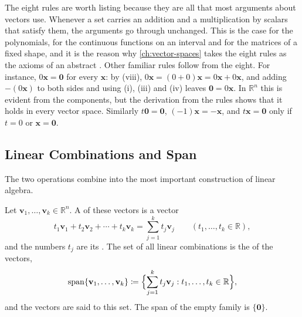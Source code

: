 The eight rules are worth listing because they are all that most arguments about vectors use. Whenever a set carries an addition and a multiplication by scalars that satisfy them, the arguments go through unchanged. This is the case for the polynomials, for the continuous functions on an interval and for the matrices of a fixed shape, and it is the reason why \cref{ch:vector-spaces} takes the eight rules as the axioms of an abstract . Other familiar rules follow from the eight. For instance, $0\mathbf x=\mathbf 0$ for every $\mathbf x$: by (viii), $0\mathbf x=(0+0)\mathbf x=0\mathbf x+0\mathbf x$, and adding $-(0\mathbf x)$ to both sides and using (i), (iii) and (iv) leaves $\mathbf 0=0\mathbf x$. In $\mathbb R^n$ this is evident from the components, but the derivation from the rules shows that it holds in every vector space. Similarly $t\mathbf 0=\mathbf 0$, $(-1)\mathbf x=-\mathbf x$, and $t\mathbf x=\mathbf 0$ only if $t=0$ or $\mathbf x=\mathbf 0$.

\subsection{Linear Combinations and Span}

The two operations combine into the most important construction of linear algebra.

\begin{definition}
\label{def:span}
Let $\mathbf v_1,\ldots,\mathbf v_k\in\mathbb R^n$. A  of these vectors is a vector
\[
t_1\mathbf v_1+t_2\mathbf v_2+\cdots+t_k\mathbf v_k=\sum_{j=1}^kt_j\mathbf v_j\qquad(t_1,\ldots,t_k\in\mathbb R),
\]
and the numbers $t_j$ are its . The set of all linear combinations is the  of the vectors,
\[
\operatorname{span}\{\mathbf v_1,\ldots,\mathbf v_k\}\coloneqq\Bigl\{\sum_{j=1}^kt_j\mathbf v_j: t_1,\ldots,t_k\in\mathbb R\Bigr\},
\]
and the vectors are said to  this set. The span of the empty family is $\{\mathbf 0\}$.
\end{definition}

